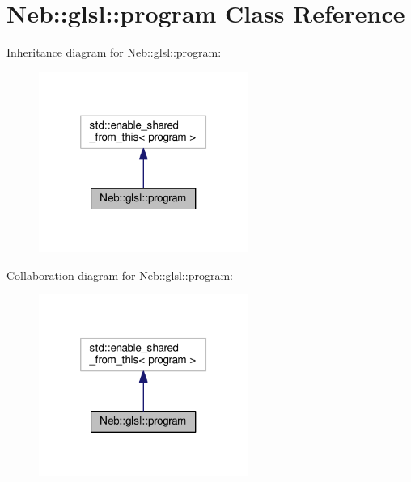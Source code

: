 \hypertarget{classNeb_1_1glsl_1_1program}{\section{Neb\-:\-:glsl\-:\-:program Class Reference}
\label{classNeb_1_1glsl_1_1program}
}


Inheritance diagram for Neb\-:\-:glsl\-:\-:program\-:
\nopagebreak
\begin{figure}[H]
\begin{center}
\leavevmode
\includegraphics[width=194pt]{classNeb_1_1glsl_1_1program__inherit__graph}
\end{center}
\end{figure}


Collaboration diagram for Neb\-:\-:glsl\-:\-:program\-:
\nopagebreak
\begin{figure}[H]
\begin{center}
\leavevmode
\includegraphics[width=194pt]{classNeb_1_1glsl_1_1program__coll__graph}
\end{center}
\end{figure}
